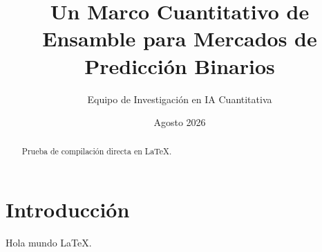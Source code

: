\documentclass[10pt,twocolumn]{article}
\title{Un Marco Cuantitativo de Ensamble para Mercados de Predicción Binarios}
\author{Equipo de Investigación en IA Cuantitativa}
\date{Agosto 2026}
\begin{document}
\maketitle
\begin{abstract}
Prueba de compilación directa en LaTeX.
\end{abstract}
\section{Introducción}
Hola mundo LaTeX.
\end{document}
